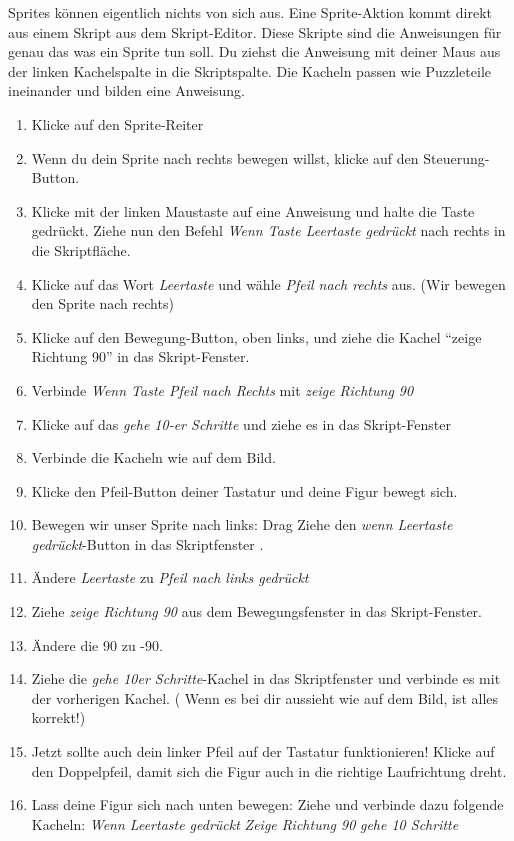 Sprites können eigentlich nichts von sich aus. Eine Sprite-Aktion kommt direkt aus einem Skript aus dem Skript-Editor. Diese Skripte sind die Anweisungen für genau das was ein Sprite tun soll.
Du ziehst die Anweisung mit deiner Maus aus der linken Kachelspalte in die Skriptspalte. Die Kacheln passen wie Puzzleteile ineinander und bilden eine Anweisung.


\begin{enumerate}
\item Klicke auf den Sprite-Reiter
\item Wenn du dein Sprite nach rechts bewegen willst, klicke auf den Steuerung-Button.
\item Klicke mit der linken Maustaste auf eine Anweisung und halte die Taste gedrückt. Ziehe nun den Befehl
 \textit{Wenn Taste Leertaste gedrückt} nach rechts in die Skriptfläche. 
\item Klicke auf das Wort \textit{Leertaste} und wähle \textit{Pfeil nach rechts} aus.  (Wir bewegen den Sprite nach rechts)
\item Klicke auf den Bewegung-Button, oben links, und ziehe die Kachel “zeige Richtung 90” in das Skript-Fenster.
\item Verbinde \textit{Wenn Taste Pfeil nach Rechts} mit \textit{zeige Richtung 90}
\item Klicke auf das \textit{gehe 10-er Schritte} und ziehe es in das Skript-Fenster 
\item Verbinde die Kacheln wie auf dem Bild. 
\item Klicke den Pfeil-Button deiner Tastatur und deine Figur bewegt sich.
\item Bewegen wir unser Sprite nach links: Drag Ziehe den \textit{wenn Leertaste gedrückt}-Button in das Skriptfenster .
\item Ändere \textit{Leertaste} zu \textit{Pfeil nach links gedrückt}
\item Ziehe \textit{zeige Richtung 90} aus dem Bewegungsfenster in das Skript-Fenster.
\item Ändere die 90 zu -90.
\item Ziehe die \textit{gehe 10er Schritte}-Kachel in das Skriptfenster und verbinde es mit der vorherigen Kachel.
( Wenn es bei dir aussieht wie auf dem Bild, ist alles korrekt!)
\item Jetzt sollte auch dein linker Pfeil auf der Tastatur funktionieren! Klicke auf den Doppelpfeil, damit sich die Figur auch in die richtige Laufrichtung dreht. 
\item Lass deine Figur sich nach unten bewegen: Ziehe und verbinde dazu folgende Kacheln:
\subitem \textit{Wenn Leertaste gedrückt}
\subitem \textit{Zeige Richtung 90}
\subitem \textit{gehe 10 Schritte}
\end{enumerate}

